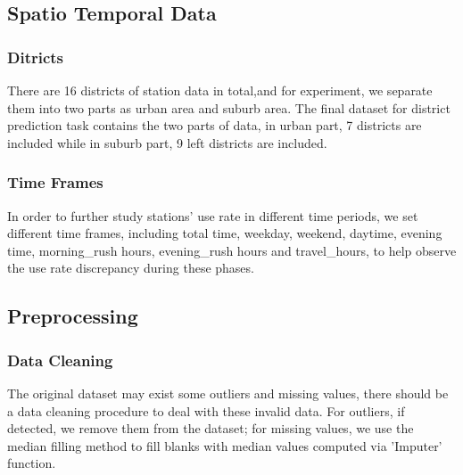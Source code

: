 \documentclass[runningheads]{llncs}
\begin{document}
\subsection{Spatio Temporal Data}

\subsubsection{Ditricts}
There are 16 districts of station data in total,and for experiment, we separate them into two parts as urban area and suburb area. The final dataset for district prediction task contains the two parts of data, in urban part, 7 districts are included while in suburb part, 9 left districts are included.
\subsubsection{Time Frames}
In order to further study stations' use rate in different time periods, we set different time frames, including total time, weekday, weekend, daytime, evening time, morning\_rush hours, evening\_rush hours and travel\_hours, to help observe the use rate discrepancy during these phases. 

\subsection{Preprocessing}
\subsubsection{Data Cleaning}
The original dataset may exist some outliers and missing values, there should be a data cleaning procedure to deal with these invalid data. For outliers, if detected, we remove them from the dataset; for missing values, we use the median filling method to fill blanks with median values computed via 'Imputer' function.
\end{document}
